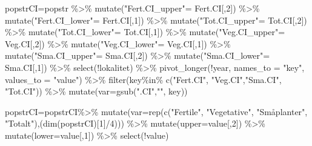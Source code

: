 \documentclass[
  letterpaper,
  DIV=11,
  numbers=noendperiod]{scrreport}
\newenvironment{Shaded}{\begin{snugshade}}{\end{snugshade}}
\newcommand{\AttributeTok}[1]{\textcolor[rgb]{0.40,0.45,0.13}{#1}}
\newcommand{\DecValTok}[1]{\textcolor[rgb]{0.68,0.00,0.00}{#1}}
\newcommand{\FunctionTok}[1]{\textcolor[rgb]{0.28,0.35,0.67}{#1}}
\newcommand{\NormalTok}[1]{\textcolor[rgb]{0.00,0.23,0.31}{#1}}
\newcommand{\OtherTok}[1]{\textcolor[rgb]{0.00,0.23,0.31}{#1}}
\newcommand{\SpecialCharTok}[1]{\textcolor[rgb]{0.37,0.37,0.37}{#1}}
\newcommand{\StringTok}[1]{\textcolor[rgb]{0.13,0.47,0.30}{#1}}
\begin{document}
\begin{Shaded}
\begin{Highlighting}[]
  
\NormalTok{  popstrCI}\OtherTok{=}\NormalTok{popstr }\SpecialCharTok{\%\textgreater{}\%} 
    \FunctionTok{mutate}\NormalTok{(}\StringTok{"Fert.CI\_upper"}\OtherTok{=}\NormalTok{ Fert.CI[,}\DecValTok{2}\NormalTok{]) }\SpecialCharTok{\%\textgreater{}\%} 
    \FunctionTok{mutate}\NormalTok{(}\StringTok{"Fert.CI\_lower"}\OtherTok{=}\NormalTok{ Fert.CI[,}\DecValTok{1}\NormalTok{]) }\SpecialCharTok{\%\textgreater{}\%} 
    \FunctionTok{mutate}\NormalTok{(}\StringTok{"Tot.CI\_upper"}\OtherTok{=}\NormalTok{ Tot.CI[,}\DecValTok{2}\NormalTok{]) }\SpecialCharTok{\%\textgreater{}\%} 
    \FunctionTok{mutate}\NormalTok{(}\StringTok{"Tot.CI\_lower"}\OtherTok{=}\NormalTok{ Tot.CI[,}\DecValTok{1}\NormalTok{]) }\SpecialCharTok{\%\textgreater{}\%}
    \FunctionTok{mutate}\NormalTok{(}\StringTok{"Veg.CI\_upper"}\OtherTok{=}\NormalTok{ Veg.CI[,}\DecValTok{2}\NormalTok{]) }\SpecialCharTok{\%\textgreater{}\%} 
    \FunctionTok{mutate}\NormalTok{(}\StringTok{"Veg.CI\_lower"}\OtherTok{=}\NormalTok{ Veg.CI[,}\DecValTok{1}\NormalTok{]) }\SpecialCharTok{\%\textgreater{}\%}
    \FunctionTok{mutate}\NormalTok{(}\StringTok{"Sma.CI\_upper"}\OtherTok{=}\NormalTok{ Sma.CI[,}\DecValTok{2}\NormalTok{]) }\SpecialCharTok{\%\textgreater{}\%} 
    \FunctionTok{mutate}\NormalTok{(}\StringTok{"Sma.CI\_lower"}\OtherTok{=}\NormalTok{ Sma.CI[,}\DecValTok{1}\NormalTok{]) }\SpecialCharTok{\%\textgreater{}\%}
    \FunctionTok{select}\NormalTok{(}\SpecialCharTok{!}\NormalTok{lokalitet) }\SpecialCharTok{\%\textgreater{}\%} 
    \FunctionTok{pivot\_longer}\NormalTok{(}\SpecialCharTok{!}\NormalTok{year, }\AttributeTok{names\_to =} \StringTok{"key"}\NormalTok{, }\AttributeTok{values\_to =} \StringTok{"value"}\NormalTok{) }\SpecialCharTok{\%\textgreater{}\%} 
    \FunctionTok{filter}\NormalTok{(key}\SpecialCharTok{\%in\%} \FunctionTok{c}\NormalTok{(}\StringTok{"Fert.CI"}\NormalTok{, }\StringTok{"Veg.CI"}\NormalTok{,}\StringTok{"Sma.CI"}\NormalTok{, }\StringTok{"Tot.CI"}\NormalTok{)) }\SpecialCharTok{\%\textgreater{}\%} 
    \FunctionTok{mutate}\NormalTok{(}\AttributeTok{var=}\FunctionTok{gsub}\NormalTok{(}\StringTok{".CI"}\NormalTok{,}\StringTok{""}\NormalTok{, key))}
  
\NormalTok{  popstrCI}\OtherTok{=}\NormalTok{popstrCI}\SpecialCharTok{\%\textgreater{}\%} 
    \FunctionTok{mutate}\NormalTok{(}\AttributeTok{var=}\FunctionTok{rep}\NormalTok{(}\FunctionTok{c}\NormalTok{(}\StringTok{"Fertile"}\NormalTok{, }\StringTok{"Vegetative"}\NormalTok{, }\StringTok{"Småplanter"}\NormalTok{, }\StringTok{"Totalt"}\NormalTok{),(}\FunctionTok{dim}\NormalTok{(popstrCI)[}\DecValTok{1}\NormalTok{]}\SpecialCharTok{/}\DecValTok{4}\NormalTok{))) }\SpecialCharTok{\%\textgreater{}\%} 
    \FunctionTok{mutate}\NormalTok{(}\AttributeTok{upper=}\NormalTok{value[,}\DecValTok{2}\NormalTok{]) }\SpecialCharTok{\%\textgreater{}\%} 
    \FunctionTok{mutate}\NormalTok{(}\AttributeTok{lower=}\NormalTok{value[,}\DecValTok{1}\NormalTok{]) }\SpecialCharTok{\%\textgreater{}\%} 
    \FunctionTok{select}\NormalTok{(}\SpecialCharTok{!}\NormalTok{value)}
  

\end{Highlighting}
\end{Shaded}
\end{document}
